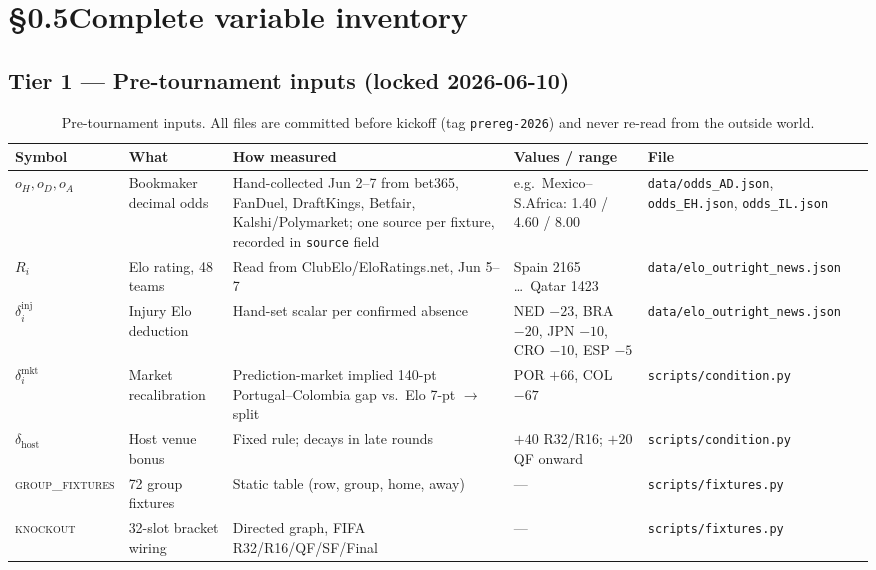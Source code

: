 \documentclass[11pt,letterpaper]{article}
\begin{document}
\section*{\S 0.5\quad Complete variable inventory}
\label{sec:inventory}

\subsection*{Tier 1 --- Pre-tournament inputs (locked 2026-06-10)}

\begin{table}[H]
\centering
\caption{Pre-tournament inputs. All files are committed before kickoff
(tag \texttt{prereg-2026}) and never re-read from the outside world.}
\label{tab:tier1}
\small
\begin{tabular}{p{2.8cm}p{3.5cm}p{3.5cm}p{2.5cm}p{2cm}}
\toprule
Symbol & What & How measured & Values / range & File \\
\midrule
$o_H, o_D, o_A$ &
  Bookmaker decimal odds &
  Hand-collected Jun 2--7 from bet365, FanDuel, DraftKings, Betfair,
  Kalshi/Polymarket; one source per fixture, recorded in \texttt{source} field &
  e.g.\ Mexico--S.Africa: 1.40 / 4.60 / 8.00 &
  \texttt{data/odds\_AD.json}, \texttt{odds\_EH.json}, \texttt{odds\_IL.json} \\[4pt]
$R_i$ &
  Elo rating, 48 teams &
  Read from ClubElo/EloRatings.net, Jun 5--7 &
  Spain 2165 \ldots\ Qatar 1423 &
  \texttt{data/elo\_outright\_news.json} \\[4pt]
$\delta_i^{\mathrm{inj}}$ &
  Injury Elo deduction &
  Hand-set scalar per confirmed absence &
  NED $-23$, BRA $-20$, JPN $-10$, CRO $-10$, ESP $-5$ &
  \texttt{data/elo\_outright\_news.json} \\[4pt]
$\delta_i^{\mathrm{mkt}}$ &
  Market recalibration &
  Prediction-market implied 140-pt Portugal--Colombia gap vs.\ Elo
  7-pt $\to$ split &
  POR $+66$, COL $-67$ &
  \texttt{scripts/condition.py} \\[4pt]
$\delta_{\mathrm{host}}$ &
  Host venue bonus &
  Fixed rule; decays in late rounds &
  $+40$ R32/R16; $+20$ QF onward &
  \texttt{scripts/condition.py} \\[4pt]
\textsc{group\_fixtures} &
  72 group fixtures &
  Static table (row, group, home, away) &
  --- &
  \texttt{scripts/fixtures.py} \\[4pt]
\textsc{knockout} &
  32-slot bracket wiring &
  Directed graph, FIFA R32/R16/QF/SF/Final &
  --- &
  \texttt{scripts/fixtures.py} \\
\bottomrule
\end{tabular}
\end{table}
\end{document}
